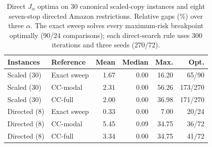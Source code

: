 \begin{table}[tb]
\centering
\caption{Direct $J_\alpha$ optima on 30 canonical scaled-copy instances and eight seven-stop directed Amazon restrictions. Relative gaps (\%) over three $\alpha$. The exact sweep solves every maximum-risk breakpoint optimally (90/24 comparisons); each direct-search rule uses 300 iterations and three seeds (270/72).}
\label{tab:direct-fff}
\scriptsize\setlength{\tabcolsep}{3pt}
\begin{tabular}{@{}llrrrr@{}}
\toprule
Instances & Reference & Mean & Median & Max. & Opt. \\\midrule
Scaled (30) & Exact sweep & 1.67 & 0.00 & 16.20 & 65/90\\
Scaled (30) & CC-modal & 2.31 & 0.00 & 56.26 & 173/270\\
Scaled (30) & CC-full & 2.00 & 0.00 & 36.98 & 171/270\\
Directed (8) & Exact sweep & 0.33 & 0.00 & 7.00 & 20/24\\
Directed (8) & CC-modal & 5.45 & 0.09 & 34.75 & 36/72\\
Directed (8) & CC-full & 3.34 & 0.00 & 34.75 & 41/72\\
\bottomrule
\end{tabular}
\end{table}
